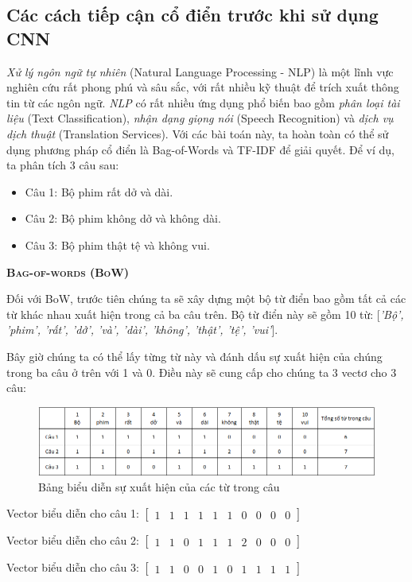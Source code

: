 \subsection{Các cách tiếp cận cổ điển trước khi sử dụng CNN}
\textit{Xử lý ngôn ngữ tự nhiên} (Natural Language Processing - NLP) là một lĩnh vực nghiên cứu rất phong phú và sâu sắc, với rất nhiều kỹ thuật để trích xuất thông tin từ các ngôn ngữ. \textit{NLP} có rất nhiều ứng dụng phổ biến bao gồm \textit{phân loại tài liệu} (Text Classification), \textit{nhận dạng giọng nói} (Speech Recognition) và \textit{dịch vụ dịch thuật} (Translation Services). Với các bài toán này, ta hoàn toàn có thể sử dụng phương pháp cổ điển là Bag-of-Words và TF-IDF để giải quyết. Để ví dụ, ta phân tích 3 câu sau:
\begin{itemize}
  \item Câu 1: Bộ phim rất dở và dài.
  \item Câu 2: Bộ phim không dở và không dài.
  \item Câu 3: Bộ phim thật tệ và không vui.
\end{itemize}

\textbf{\textsc{Bag-of-words (BoW)}}

Đối với BoW, trước tiên chúng ta sẽ xây dựng một bộ từ điển bao gồm tất cả các từ khác nhau xuất hiện trong cả ba câu trên. Bộ từ điển này sẽ gồm 10 từ: [\textit{'Bộ', 'phim', 'rất', 'dở', 'và', 'dài', 'không', 'thật', 'tệ', 'vui'}].

Bây giờ chúng ta có thể lấy từng từ này và đánh dấu sự xuất hiện của chúng trong ba câu ở trên với 1 và 0. Điều này sẽ cung cấp cho chúng ta 3 vectơ cho 3 câu:

\begin{figure}[!h]
	\centering
		\includegraphics[width=1\columnwidth]{chapter05/figure/BoW.PNG}
        \caption{Bảng biểu diễn sự xuất hiện của các từ trong câu}
        \label{fig:BoW}
\end{figure}

\begin{center}
    Vector biểu diễn cho câu 1: 
    $\begin{bmatrix}
        1 & 1 & 1 & 1 & 1 & 1 & 0 & 0 & 0 & 0
    \end{bmatrix}$
    
    Vector biểu diễn cho câu 2: 
    $\begin{bmatrix}
      1 & 1 & 0 & 1 & 1 & 1 & 2 & 0 & 0 & 0
    \end{bmatrix}$
    
    Vector biểu diễn cho câu 3: 
    $\begin{bmatrix}
      1 & 1 & 0 & 0 & 1 & 0 & 1 & 1 & 1 & 1
    \end{bmatrix}$
\end{center}

